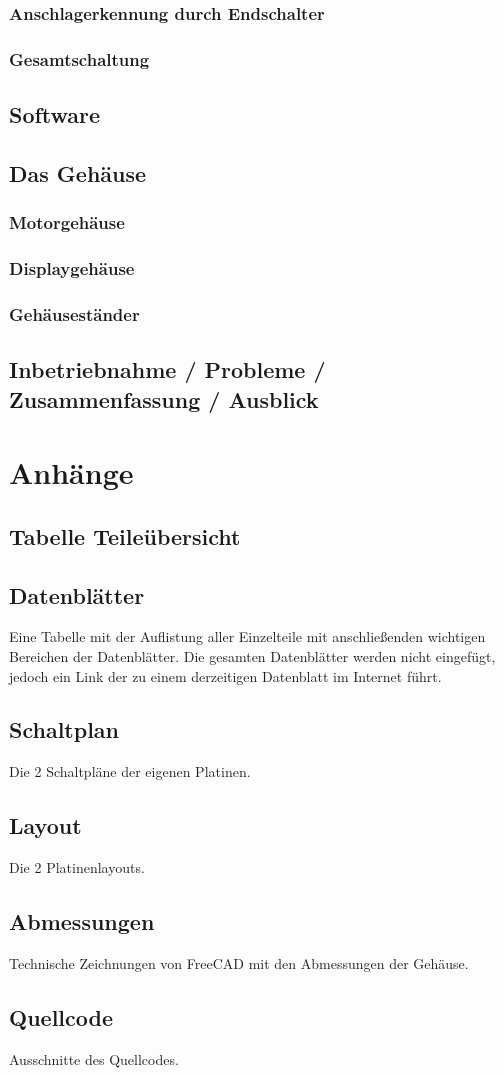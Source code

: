 \documentclass[11pt, titlepage, fleqn]{report}
\begin{document}
			\subsection{Anschlagerkennung durch Endschalter}
			\subsection{Gesamtschaltung}
		\section{Software}
		\section{Das Gehäuse}
			\subsection{Motorgehäuse}
			\subsection{Displaygehäuse}
			\subsection{Gehäuseständer}
		\section{Inbetriebnahme / Probleme / Zusammenfassung / Ausblick}
	\chapter{Anhänge}
		\section{Tabelle Teileübersicht}
		\section{Datenblätter}
			Eine Tabelle mit der Auflistung aller Einzelteile mit anschließenden wichtigen Bereichen der Datenblätter.
			Die gesamten Datenblätter werden nicht eingefügt, jedoch ein Link der zu einem derzeitigen Datenblatt im Internet führt.
		\section{Schaltplan}
			Die 2 Schaltpläne der eigenen Platinen.
		\section{Layout}
			Die 2 Platinenlayouts.
		\section{Abmessungen}
			Technische Zeichnungen von FreeCAD mit den Abmessungen der Gehäuse.
		\section{Quellcode}
			Ausschnitte des Quellcodes.
	
\end{document}
